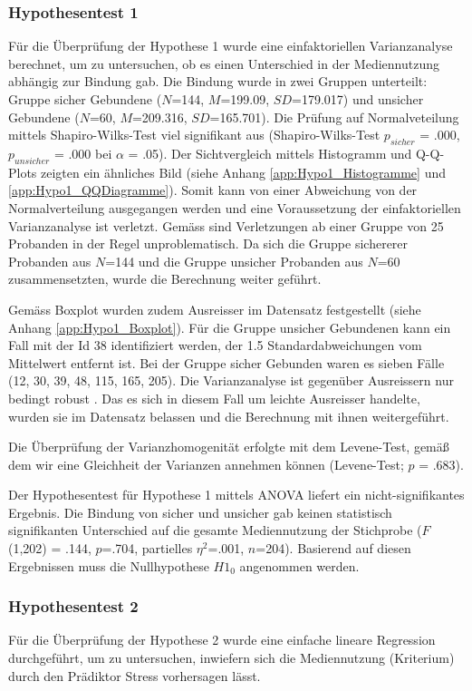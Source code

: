 \subsubsection{Hypothesentest 1}\label{sec:Hypothesentest1}
Für die Überprüfung der Hypothese 1 wurde eine einfaktoriellen Varianzanalyse berechnet, um zu untersuchen, ob es einen Unterschied in der Mediennutzung abhängig zur Bindung gab. Die Bindung wurde in zwei Gruppen unterteilt: Gruppe sicher Gebundene ($N$=144, $M$=199.09, $SD$=179.017) und unsicher Gebundene ($N$=60, $M$=209.316, $SD$=165.701). Die Prüfung auf Normalveteilung mittels Shapiro-Wilks-Test \cite{Shapiro1965} viel signifikant aus (Shapiro-Wilks-Test $p_{sicher}$ = .000, $p_{unsicher}$ = .000 bei $\alpha$ = .05). Der Sichtvergleich mittels Histogramm und Q-Q-Plots zeigten ein ähnliches Bild (siehe Anhang \ref{app:Hypo1_Histogramme} und \ref{app:Hypo1_QQDiagramme}). Somit kann von einer Abweichung von der Normalverteilung ausgegangen werden \cite{Hemmerich2018} und eine Voraussetzung der einfaktoriellen Varianzanalyse ist verletzt. Gemäss  sind Verletzungen ab einer Gruppe von 25 Probanden in der Regel unproblematisch. Da sich die Gruppe sichererer Probanden aus $N$=144 und die Gruppe unsicher Probanden aus $N$=60 zusammensetzten, wurde die Berechnung weiter geführt.

Gemäss Boxplot wurden zudem Ausreisser im Datensatz festgestellt (siehe Anhang \ref{app:Hypo1_Boxplot}). Für die Gruppe unsicher Gebundenen kann ein Fall mit der Id 38 identifiziert werden, der 1.5 Standardabweichungen vom Mittelwert entfernt ist. Bei der Gruppe sicher Gebunden waren es sieben Fälle (12, 30, 39, 48, 115, 165, 205). Die Varianzanalyse ist gegenüber Ausreissern nur bedingt robust \cite{Hemmerich2018}. Das es sich in diesem Fall um leichte Ausreisser handelte, wurden sie im Datensatz belassen und die Berechnung mit ihnen weitergeführt.  

Die Überprüfung der Varianzhomogenität erfolgte mit dem Levene-Test, gemäß dem wir eine Gleichheit der Varianzen annehmen können (Levene-Test; $p$ = .683). 

Der Hypothesentest für Hypothese 1 mittels ANOVA liefert ein nicht-signifikantes Ergebnis. Die Bindung von sicher und unsicher gab keinen statistisch signifikanten Unterschied auf die gesamte Mediennutzung der Stichprobe ($F$(1,202) = .144, $p$=.704, partielles $\eta^2$=.001, $n$=204). Basierend auf diesen Ergebnissen muss die Nullhypothese $H1_{0}$ angenommen werden. 

\subsubsection{Hypothesentest 2}
Für die Überprüfung der Hypothese 2 wurde eine einfache lineare Regression durchgeführt, um zu untersuchen, inwiefern sich die Mediennutzung (Kriterium) durch den Prädiktor Stress vorhersagen lässt.

